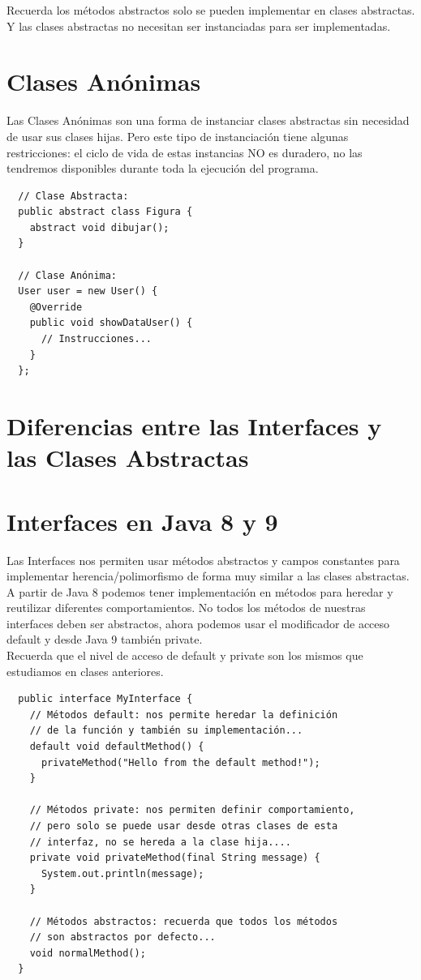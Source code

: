 \documentclass{article}
\begin{document}
Recuerda los métodos abstractos solo se pueden implementar en clases
abstractas. Y las clases abstractas no necesitan ser instanciadas para ser
implementadas.\\

\section{Clases Anónimas}%
Las Clases Anónimas son una forma de instanciar clases abstractas sin necesidad
de usar sus clases hijas. Pero este tipo de instanciación tiene algunas
restricciones: el ciclo de vida de estas instancias NO es duradero, no las
tendremos disponibles durante toda la ejecución del programa.

\begin{verbatim}
  // Clase Abstracta:
  public abstract class Figura {
    abstract void dibujar();
  }

  // Clase Anónima:
  User user = new User() {
    @Override
    public void showDataUser() {
      // Instrucciones...
    }
  };
\end{verbatim}


\section{Diferencias entre las Interfaces y las Clases Abstractas}%


\section{Interfaces en Java 8 y 9}%
Las Interfaces nos permiten usar métodos abstractos y campos constantes para
implementar herencia/polimorfismo de forma muy similar a las clases
abstractas.\\

A partir de Java 8 podemos tener implementación en métodos para heredar y
reutilizar diferentes comportamientos. No todos los métodos de nuestras
interfaces deben ser abstractos, ahora podemos usar el modificador de acceso
default y desde Java 9 también private.\\

Recuerda que el nivel de acceso de default y private son los mismos que
estudiamos en clases anteriores.\\

\begin{verbatim}
  public interface MyInterface {
    // Métodos default: nos permite heredar la definición
    // de la función y también su implementación...
    default void defaultMethod() {
      privateMethod("Hello from the default method!");
    }

    // Métodos private: nos permiten definir comportamiento,
    // pero solo se puede usar desde otras clases de esta
    // interfaz, no se hereda a la clase hija....
    private void privateMethod(final String message) {
      System.out.println(message);
    }

    // Métodos abstractos: recuerda que todos los métodos
    // son abstractos por defecto...
    void normalMethod();
  }
\end{verbatim}
\end{document}
